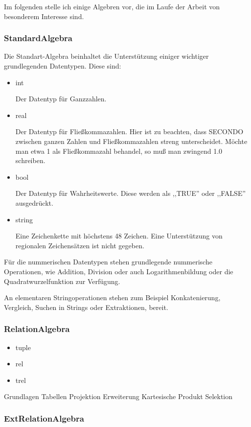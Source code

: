Im folgenden stelle ich einige Algebren vor, die im Laufe der Arbeit von besonderem Interesse sind. 

\subsubsection{StandardAlgebra}
Die Standart-Algebra beinhaltet die Unterstützung einiger wichtiger grundlegenden Datentypen. Diese sind:
\begin{itemize}
\item int

Der Datentyp für Ganzzahlen.
\item real

Der Datentyp für Fließkommazahlen. Hier ist zu beachten, dass SECONDO zwischen ganzen Zahlen und Fließkommazahlen streng unterscheidet. Möchte man etwa 1 als Fließkommazahl behandel, so muß man zwingend 1.0 schreiben.
\item bool

Der Datentyp für Wahrheitswerte. Diese werden als ,,TRUE'' oder ,,FALSE'' ausgedrückt.
\item string

Eine Zeichenkette mit höchstens 48 Zeichen. Eine Unterstützung von regionalen Zeichensätzen ist nicht gegeben.
\end{itemize}

Für die nummerischen Datentypen stehen grundlegende nummerische Operationen, wie Addition, Division oder auch Logarithmenbildung oder die Quadratwurzelfunktion zur Verfügung.

An elementaren Stringoperationen stehen zum Beispiel Konkatenierung, Vergleich, Suchen in Strings oder Extraktionen, bereit.

\subsubsection{RelationAlgebra}
\begin{itemize}
\item tuple
\item rel
\item trel
\end{itemize}
Grundlagen Tabellen          Projektion Erweiterung Kartesische Produkt Selektion

\subsubsection{ExtRelationAlgebra}

